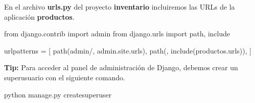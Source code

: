 \documentclass[
  a4paper,
  DIV=11,
  numbers=noendperiod,
  onepage,
  openany]{scrreprt}
\newenvironment{Shaded}{\begin{snugshade}}{\end{snugshade}}
\newcommand{\ExtensionTok}[1]{\textcolor[rgb]{0.00,0.23,0.31}{#1}}
\newcommand{\ImportTok}[1]{\textcolor[rgb]{0.00,0.46,0.62}{#1}}
\newcommand{\NormalTok}[1]{\textcolor[rgb]{0.00,0.23,0.31}{#1}}
\newcommand{\OperatorTok}[1]{\textcolor[rgb]{0.37,0.37,0.37}{#1}}
\newcommand{\StringTok}[1]{\textcolor[rgb]{0.13,0.47,0.30}{#1}}
\begin{document}
En el archivo \textbf{urls.py} del proyecto \textbf{inventario}
incluiremos las URLs de la aplicación \textbf{productos}.

\begin{Shaded}
\begin{Highlighting}[]
\ImportTok{from}\NormalTok{ django.contrib }\ImportTok{import}\NormalTok{ admin}
\ImportTok{from}\NormalTok{ django.urls }\ImportTok{import}\NormalTok{ path, include}

\NormalTok{urlpatterns }\OperatorTok{=}\NormalTok{ [}
\NormalTok{    path(}\StringTok{\textquotesingle{}admin/\textquotesingle{}}\NormalTok{, admin.site.urls),}
\NormalTok{    path(}\StringTok{\textquotesingle{}\textquotesingle{}}\NormalTok{, include(}\StringTok{\textquotesingle{}productos.urls\textquotesingle{}}\NormalTok{)),}
\NormalTok{]}
\end{Highlighting}
\end{Shaded}

\begin{tcolorbox}[enhanced jigsaw, title=\textcolor{quarto-callout-tip-color}{\faLightbulb}\hspace{0.5em}{Tip}, colback=white, rightrule=.15mm, opacityback=0, colframe=quarto-callout-tip-color-frame, titlerule=0mm, opacitybacktitle=0.6, breakable, coltitle=black, colbacktitle=quarto-callout-tip-color!10!white, bottomtitle=1mm, toptitle=1mm, left=2mm, arc=.35mm, toprule=.15mm, leftrule=.75mm, bottomrule=.15mm]

\textbf{Tip:} Para acceder al panel de administración de Django, debemos
crear un superusuario con el siguiente comando.

\begin{Shaded}
\begin{Highlighting}[]
\ExtensionTok{python}\NormalTok{ manage.py createsuperuser}
\end{Highlighting}
\end{Shaded}

\end{tcolorbox}
\end{document}
